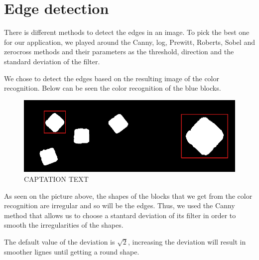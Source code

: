  \section{Edge detection}

	There is different methods to detect the edges in an image. To pick the best one for our application, we played around the Canny, log, Prewitt, Roberts, Sobel and zerocross methods and their parameters as the threshold, direction and the standard deviation of the filter. \par

 \begin{flushleft}
	We chose to detect the edges based on the resulting image of the color recognition. Below can be seen the color recognition of the blue blocks.
 \end{flushleft}

	\begin{figure}[hb]
  \centering
  \includegraphics[scale=0.3]{figures/color_rec_zoom.png}
  \caption[LABEL] {CAPTATION TEXT}
\end{figure}	
	

 \begin{flushleft}
As seen on the picture above, the shapes of the blocks that we get from the color recognition are irregular and so will be the edges. Thus, we used the Canny method that allows us to choose a stantard deviation of its filter in order to smooth the irregularities of the shapes.\par 
 \end{flushleft}

\begin{flushleft}
The default value of the deviation is $\sqrt{2}$, increasing the deviation will result in smoother lignes until getting a round shape.
\end{flushleft}

